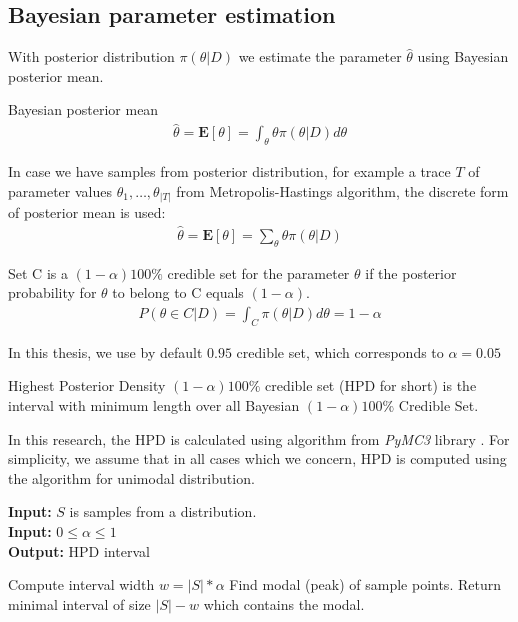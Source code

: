 \subsection{Bayesian parameter estimation}
With posterior distribution $\pi(\theta|D)$ we estimate the parameter $\hat{\theta}$ using Bayesian
posterior mean.
\begin{definition}{Bayesian posterior mean}
      \begin{align*}
            \hat{\theta} = \mathbf{E}[\theta] = \int_\theta \theta \pi(\theta|D) d\theta
      \end{align*}
\end{definition}
In case we have samples from posterior distribution, for example a trace $T$ of parameter values
${\theta_1,\dots,\theta_|T|}$ from Metropolis-Hastings algorithm, the discrete form of posterior
mean is used:
\begin{align*}
      \hat{\theta} = \mathbf{E}[\theta] = \sum_\theta \theta \pi(\theta|D)
\end{align*}

\begin{definition}
      Set C is a $(1 − \alpha )100\%$ credible set for the parameter $\theta$ if the posterior
      probability for $\theta$ to belong to C equals $(1 − \alpha)$.
      \begin{align*}
            P(\theta \in C | D) = \int_C \pi(\theta|D) d\theta = 1 - \alpha
      \end{align*}
\end{definition}
In this thesis, we use by default $0.95$ credible set, which corresponds to $\alpha=0.05$
\begin{definition}
      Highest Posterior Density $(1-\alpha)100\%$ credible set (HPD for short) is the
      interval with minimum length over all Bayesian $(1-\alpha)100\%$ Credible Set.
\end{definition}

In this research, the HPD is calculated using algorithm from \textit{PyMC3} library
\cite{salvatier2016pymc3}. For simplicity, we assume that in all cases which we concern, HPD is
computed using the algorithm for unimodal distribution.
\begin{algorithm}[H]
      \caption{Compute Highest Posterior Density Interval}
      \label{mh}
      \hspace*{\algorithmicindent} \textbf{Input:} $S$ is samples from a distribution. \\
      \hspace*{\algorithmicindent} \textbf{Input:} $0\leq \alpha \leq 1$ \\
      \hspace*{\algorithmicindent} \textbf{Output:} HPD interval
      \begin{algorithmic}[1]
            \State Compute interval width $w = |S| * \alpha$
            \State Find modal (peak) of sample points.
            \State Return minimal interval of size $|S| - w$ which contains the modal.
            \EndProcedure
      \end{algorithmic}
\end{algorithm}

